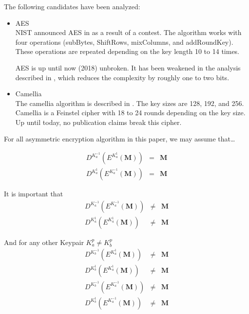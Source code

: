 The following candidates have been analyzed:
\begin{itemize}
	\item AES\\
	NIST announced AES in \citeyear{standard2001announcing} as a result of a contest. The algorithm works with four operations (subBytes, ShiftRows, mixColumns, and addRoundKey). These operations are repeated depending on the key length 10 to 14 times. 
	
	AES is up until now (2018) unbroken. It has been weakened in the analysis described in \cite{tao2015improving}, which reduces the complexity by roughly one to two bits. 
	
	\item Camellia\\
	The camellia algorithm is described in \cite{rfc3713}. The key sizes are 128, 192, and 256. Camellia is a Feinstel cipher with 18 to 24 rounds depending on the key size. Up until today, no publication claims break this cipher. 
\end{itemize}

For all asymmetric encryption algorithm in this paper, we may assume that\ldots

\begin{eqnarray}
D^{K^{-1}_a}\left(E^{K^{1}_a}\left(\mathbf{M}\right)\right) & = & \mathbf{M}\\
D^{K^{1}_a}\left(E^{K^{-1}_a}\left(\mathbf{M}\right)\right) & = & \mathbf{M}
\end{eqnarray} 

It is important that 
\begin{eqnarray}
D^{K^{-1}_a}\left(E^{K^{-1}_a}\left(\mathbf{M}\right)\right) & \neq & \mathbf{M}\\
D^{K^{1}_a}\left(E^{K^{1}_a}\left(\mathbf{M}\right)\right)   & \neq & \mathbf{M}
\end{eqnarray} 

And for any other Keypair $K^{p}_a \neq K^{p}_b$
\begin{eqnarray}
D^{K^{-1}_b}\left(E^{K^{1}_a}\left(\mathbf{M}\right)\right)  & \neq & \mathbf{M}\\
D^{K^{1}_b}\left(E^{K^{1}_a}\left(\mathbf{M}\right)\right)   & \neq & \mathbf{M}\\
D^{K^{-1}_b}\left(E^{K^{-1}_a}\left(\mathbf{M}\right)\right) & \neq & \mathbf{M}\\
D^{K^{1}_b}\left(E^{K^{-1}_a}\left(\mathbf{M}\right)\right)  & \neq & \mathbf{M}
\end{eqnarray} 

